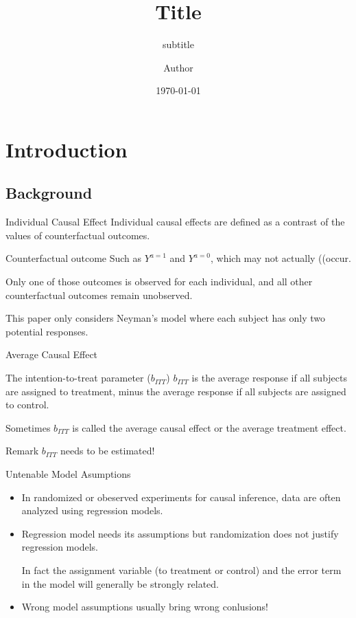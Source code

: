 \documentclass{beamer}
\title{Title}
\subtitle{subtitle}
\author{Author}
\institute{
	Univ. of Sci. \& Tech. of China
}
\date{\today}
\begin{document}
	\begin{frame}
		\titlepage
	\end{frame}
	\begin{frame}
		\tableofcontents
	\end{frame}
\section{Introduction}
\subsection{Background}
\begin{frame}{Individual Causal Effect}
	Individual causal effects are defined as a contrast of the values of
	counterfactual outcomes. 
\begin{block}{Counterfactual outcome}
	Such as $Y^{a=1}$ and $Y^{a=0}$, which may not actually ((occur. 
	
	Only one of those outcomes is observed for each individual, and all
	other counterfactual outcomes remain unobserved.
\end{block}
	This paper only considers Neyman's model where each subject has only two potential responses.
	\end{frame}
\begin{frame}{Average Causal Effect}
	
	\begin{block}{The intention-to-treat parameter ($b_{ITT}$)}
			$b_{ITT}$ is the average response if all subjects are assigned to treatment, minus the average response if all subjects are assigned to control.
		\end{block}
	 
	  Sometimes $b_{ITT}$ is called the average causal effect or the average treatment effect. 
	  \begin{block}{Remark}
	  	$b_{ITT}$ needs to be estimated!
	  \end{block}
\end{frame}
\begin{frame}{Untenable Model Asumptions}
	\begin{itemize}
		\item In randomized or obeserved experiments for causal inference, data are often analyzed using regression models. 
		\begin{equation*}
		\end{equation*}
		\item Regression model needs its assumptions but randomization does not justify regression models. 
		
		In fact the assignment variable (to treatment or control) and the error term in the model will generally be strongly related.
		\begin{equation*}
		\end{equation*}
		\item Wrong model assumptions usually bring wrong conlusions!
	\end{itemize}
\end{frame}
\end{document}
